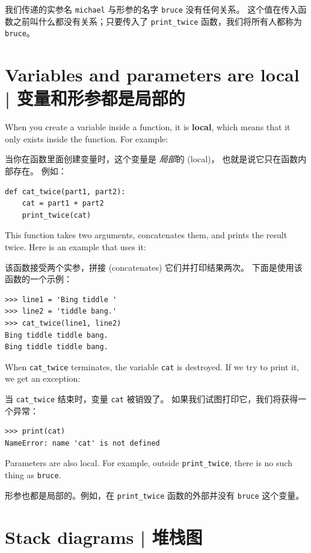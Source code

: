 我们传递的实参名 \lstinline{michael} 与形参的名字 \lstinline{bruce} 没有任何关系。 这个值在传入函数之前叫什么都没有关系；只要传入了 \lstinline{print_twice} 函数，我们将所有人都称为 \lstinline{bruce}。


%
\section{Variables and parameters are local  |  变量和形参都是局部的}
  
  

When you create a variable inside a function, it is {\bf local},
which means that it only
exists inside the function.  For example:

当你在函数里面创建变量时，这个变量是 {\em 局部}的 (local)，
也就是说它只在函数内部存在。 例如：

\begin{lstlisting}
def cat_twice(part1, part2):
    cat = part1 + part2
    print_twice(cat)
\end{lstlisting}
%
This function takes two arguments, concatenates them, and prints
the result twice.  Here is an example that uses it:

该函数接受两个实参，拼接 (concatenates) 它们并打印结果两次。 下面是使用该函数的一个示例：

\begin{lstlisting}
>>> line1 = 'Bing tiddle '
>>> line2 = 'tiddle bang.'
>>> cat_twice(line1, line2)
Bing tiddle tiddle bang.
Bing tiddle tiddle bang.
\end{lstlisting}
%
When \verb"cat_twice" terminates, the variable {\tt cat}
is destroyed.  If we try to print it, we get an exception:
  

当 \lstinline{cat_twice} 结束时，变量 \lstinline{cat} 被销毁了。
如果我们试图打印它，我们将获得一个异常：

\begin{lstlisting}
>>> print(cat)
NameError: name 'cat' is not defined
\end{lstlisting}
%
Parameters are also local.
For example, outside \verb"print_twice", there is no
such thing as {\tt bruce}.

形参也都是局部的。例如，在 \lstinline{print_twice} 函数的外部并没有 \lstinline{bruce} 这个变量。


%
\section{Stack diagrams  |  堆栈图}
\label{stackdiagram}
    
    

